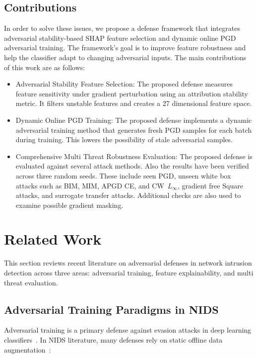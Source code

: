 \documentclass[conference]{IEEEtran}
\begin{document}
\subsection{Contributions}
In order to solve these issues, we propose a defense framework that integrates adversarial stability-based SHAP feature selection and dynamic online PGD adversarial training. The framework's goal is to improve feature robustness and help the classifier adapt to changing adversarial inputs. The main contributions of this work are as follows:
\begin{itemize}
    \item Adversarial Stability Feature Selection: The proposed defense measures feature sensitivity under gradient perturbation using an attribution stability metric. It filters unstable features and creates a 27 dimensional feature space.
    \item Dynamic Online PGD Training: The proposed defense implements a dynamic adversarial training method that generates fresh PGD samples for each batch during training. This lowers the possibility of stale adversarial samples.
    \item Comprehensive Multi Threat Robustness Evaluation: The proposed defense is evaluated against several attack methods. Also the results have been verified across three random seeds. These include seen PGD, unseen white box attacks such as BIM, MIM, APGD CE, and CW~$L_\infty$, gradient free Square attacks, and surrogate transfer attacks. Additional checks are also used to examine possible gradient masking.
\end{itemize}

\section{Related Work}
This section reviews recent literature on adversarial defenses in network intrusion detection across three areas: adversarial training, feature explainability, and multi threat evaluation.

\subsection{Adversarial Training Paradigms in NIDS}
Adversarial training is a primary defense against evasion attacks in deep learning classifiers~\cite{ref5}. In NIDS literature, many defenses rely on static offline data augmentation~\cite{ref4,ref11,ref13}:
\end{document}
